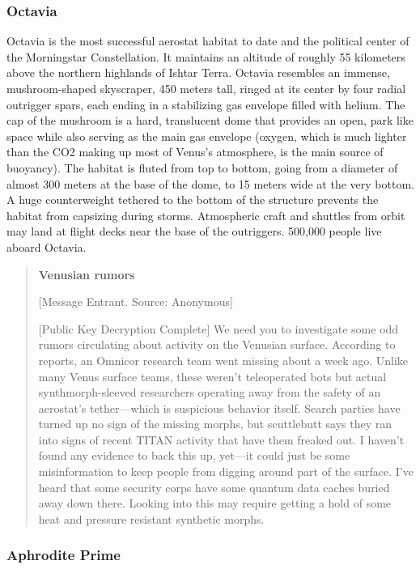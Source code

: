 \subsubsection{Octavia} \label{sec:octavia} 

Octavia is the most successful aerostat habitat to date and the political center of the Morningstar Constellation. It maintains an altitude of roughly 55 kilometers above the northern highlands of Ishtar Terra. Octavia resembles an immense, mushroom-shaped skyscraper, 450 meters tall, ringed at its center by four radial outrigger spars, each ending in a stabilizing gas envelope filled with helium. The cap of the mushroom is a hard, translucent dome that provides an open, park like space while also serving as the main gas envelope (oxygen, which is much lighter than the CO2 making up most of Venus's atmosphere, is the main source of buoyancy). The habitat is fluted from top to bottom, going from a diameter of almost 300 meters at the base of the dome, to 15 meters wide at the very bottom. A huge counterweight tethered to the bottom of the structure prevents the habitat from capsizing during storms. Atmospheric craft and shuttles from orbit may land at flight decks near the base of the outriggers. 500,000 people live aboard Octavia. 

\begin{quotation} \textbf{Venusian rumors} 

[Message Entrant. Source: Anonymous] 

[Public Key Decryption Complete] We need you to investigate some odd rumors circulating about activity on the Venusian surface. According to reports, an Omnicor research team went missing about a week ago. Unlike many Venus surface teams, these weren't teleoperated bots but actual synthmorph-sleeved researchers operating away from the safety of an aerostat's tether—which is suspicious behavior itself. Search parties have turned up no sign of the missing morphs, but scuttlebutt says they ran into signs of recent TITAN activity that have them freaked out. I haven't found any evidence to back this up, yet—it could just be some misinformation to keep people from digging around part of the surface. I've heard that some security corps have some quantum data caches buried away down there. Looking into this may require getting a hold of some heat and pressure resistant synthetic morphs. \end{quotation} 

\subsubsection{Aphrodite Prime} \label{sec:aphrodite-prime} 

